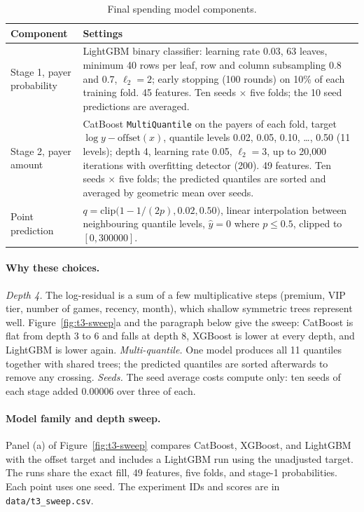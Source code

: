 \documentclass[../main.tex]{subfiles}
\begin{document}
\begin{table}[H]\centering\small
\begin{tabular}{@{}L{.20\linewidth}L{.74\linewidth}@{}}
\toprule
\textbf{Component} & \textbf{Settings} \\
\midrule
Stage 1, payer probability & LightGBM binary classifier: learning rate 0.03, 63 leaves, minimum 40 rows per leaf, row and column subsampling 0.8 and 0.7, $\ell_2=2$; early stopping (100 rounds) on 10\% of each training fold. 45 features. Ten seeds $\times$ five folds; the 10 seed predictions are averaged. \\
Stage 2, payer amount & CatBoost \texttt{MultiQuantile} on the payers of each fold, target $\log y-\text{offset}(x)$, quantile levels 0.02, 0.05, 0.10, \ldots, 0.50 (11 levels); depth 4, learning rate 0.05, $\ell_2=3$, up to 20{,}000 iterations with overfitting detector (200). 49 features. Ten seeds $\times$ five folds; the predicted quantiles are sorted and averaged by geometric mean over seeds. \\
Point prediction & $q=\mathrm{clip}\bigl(1-1/(2p),0.02,0.50\bigr)$, linear interpolation between neighbouring quantile levels, $\hat y=0$ where $p\le0.5$, clipped to $[0,300000]$. \\
\bottomrule
\end{tabular}
\caption{Final spending model components.}\label{tab:t3-models}
\end{table}

\paragraph{Why these choices.} \emph{Depth 4.} The log-residual is a sum of a few multiplicative steps (premium, VIP tier, number of games, recency, month), which shallow symmetric trees represent well. Figure~\ref{fig:t3-sweep}a and the paragraph below give the sweep: CatBoost is flat from depth 3 to 6 and falls at depth 8, XGBoost \citep{xgboost} is lower at every depth, and LightGBM is lower again. \emph{Multi-quantile.} One model produces all 11 quantiles together with shared trees; the predicted quantiles are sorted afterwards to remove any crossing. \emph{Seeds.} The seed average costs compute only: ten seeds of each stage added 0.00006 over three of each.

\paragraph{Model family and depth sweep.} Panel (a) of Figure~\ref{fig:t3-sweep} compares CatBoost, XGBoost, and LightGBM with the offset target and includes a LightGBM run using the unadjusted target. The runs share the exact fill, 49 features, five folds, and stage-1 probabilities. Each point uses one seed. The experiment IDs and scores are in \texttt{data/t3\_sweep.csv}.
\end{document}
